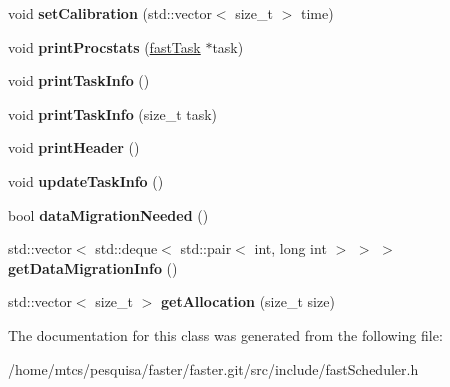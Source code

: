 \begin{DoxyCompactItemize}
\item 
\hypertarget{classfaster_1_1fastScheduler_a4d2aec030cd131b05c7091921545b3a4}{}void {\bfseries set\+Calibration} (std\+::vector$<$ size\+\_\+t $>$ time)\label{classfaster_1_1fastScheduler_a4d2aec030cd131b05c7091921545b3a4}

\item 
\hypertarget{classfaster_1_1fastScheduler_a17a44cb80cf026772647d5226ed56fcb}{}void {\bfseries print\+Procstats} (\hyperlink{classfaster_1_1fastTask}{fast\+Task} $\ast$task)\label{classfaster_1_1fastScheduler_a17a44cb80cf026772647d5226ed56fcb}

\item 
\hypertarget{classfaster_1_1fastScheduler_a426b97359b035f696ea99b0ce65ed781}{}void {\bfseries print\+Task\+Info} ()\label{classfaster_1_1fastScheduler_a426b97359b035f696ea99b0ce65ed781}

\item 
\hypertarget{classfaster_1_1fastScheduler_a93a5bb37ea8bc6a8d601dd01a2ed736b}{}void {\bfseries print\+Task\+Info} (size\+\_\+t task)\label{classfaster_1_1fastScheduler_a93a5bb37ea8bc6a8d601dd01a2ed736b}

\item 
\hypertarget{classfaster_1_1fastScheduler_a6c4b825db8c979eafead42e321e95d05}{}void {\bfseries print\+Header} ()\label{classfaster_1_1fastScheduler_a6c4b825db8c979eafead42e321e95d05}

\item 
\hypertarget{classfaster_1_1fastScheduler_a0c91feaec23646ee84e1fa530fe7cccf}{}void {\bfseries update\+Task\+Info} ()\label{classfaster_1_1fastScheduler_a0c91feaec23646ee84e1fa530fe7cccf}

\item 
\hypertarget{classfaster_1_1fastScheduler_a650ace70f7cb64835674cd67a5f605ca}{}bool {\bfseries data\+Migration\+Needed} ()\label{classfaster_1_1fastScheduler_a650ace70f7cb64835674cd67a5f605ca}

\item 
\hypertarget{classfaster_1_1fastScheduler_ab268908c69c5c78075c97b1189d599b8}{}std\+::vector$<$ std\+::deque$<$ std\+::pair$<$ int, long int $>$ $>$ $>$ {\bfseries get\+Data\+Migration\+Info} ()\label{classfaster_1_1fastScheduler_ab268908c69c5c78075c97b1189d599b8}

\item 
\hypertarget{classfaster_1_1fastScheduler_a0cc2c0d858e78cf5502d365da5877f71}{}std\+::vector$<$ size\+\_\+t $>$ {\bfseries get\+Allocation} (size\+\_\+t size)\label{classfaster_1_1fastScheduler_a0cc2c0d858e78cf5502d365da5877f71}

\end{DoxyCompactItemize}


The documentation for this class was generated from the following file\+:\begin{DoxyCompactItemize}
\item 
/home/mtcs/pesquisa/faster/faster.\+git/src/include/fast\+Scheduler.\+h\end{DoxyCompactItemize}
